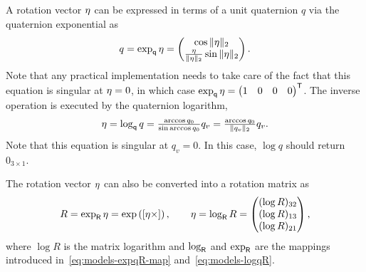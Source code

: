 A rotation vector $\eta$ can be expressed in terms of a unit quaternion $q$ via the quaternion exponential as
\begin{align}
q = \exp_\mathsf{q} \eta = \begin{pmatrix} \cos \| \eta \|_2 \\ \tfrac{\eta}{\| \eta \|_2} \sin \| \eta \|_2 \end{pmatrix}.
\label{eq:app-quatExp}
\end{align}
Note that any practical implementation needs to take care of the fact that this equation is singular at $\eta = 0$, in which case $\exp_\mathsf{q} \eta = \begin{pmatrix} 1 & 0 & 0 & 0 \end{pmatrix}^{\mathsf{T}}$. The inverse operation is executed by the quaternion logarithm, 
\begin{align}
\eta = \log_\mathsf{q} q = \tfrac{\arccos q_0}{\sin \arccos q_0} q_v = \tfrac{\arccos q_0}{\| q_v\|_2} q_v.
\label{eq:app-quatLog}
\end{align}
Note that this equation is singular at $q_v = 0$. In this case, $\log q$ should return $0_{3 \times 1}$. 
 
The rotation vector $\eta$ can also be converted into a rotation matrix as 
\begin{align}
R = \exp_\mathsf{R} \eta = \exp \left( [\eta \times] \right), \qquad \eta = \log_\mathsf{R} R = \begin{pmatrix} (\log R)_{32} \\ (\log R)_{13} \\ (\log R)_{21} \end{pmatrix},
\end{align}
where $\log R$ is the matrix logarithm and $\log_\mathsf{R}$ and $\exp_\mathsf{R}$ are the mappings introduced in~\eqref{eq:models-expqR-map} and~\eqref{eq:models-logqR}.

